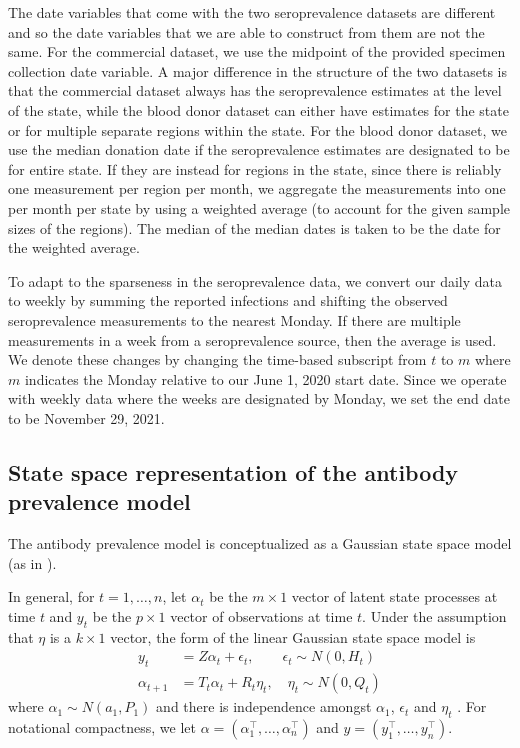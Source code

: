 The date variables that come with the two seroprevalence datasets are different
and so the date variables that we are able to construct from them are not the
same. For the commercial dataset, we use the midpoint of the provided specimen
collection date variable. A major difference in the structure of the two
datasets is that the commercial dataset always has the seroprevalence estimates
at the level of the state, while the blood donor dataset can either have
estimates for the state or for multiple separate regions within the state. For
the blood donor dataset, we use the median donation date if the seroprevalence
estimates are designated to be for entire state. If they are instead for regions
in the state, since there is reliably one measurement per region per month, we
aggregate the measurements into one per month per state by using a weighted
average (to account for the given sample sizes of the regions). The median of
the median dates is taken to be the date for the weighted average.

To adapt to the sparseness in the seroprevalence data, we convert our daily data
to weekly by summing the reported infections and shifting the observed
seroprevalence measurements to the nearest Monday. If there are multiple
measurements in a week from a seroprevalence source, then the average is used.
We denote these changes by changing the time-based subscript from $t$ to $m$
where $m$ indicates the Monday relative to our June 1, 2020 start date.
Since we operate with weekly data where the weeks are designated by Monday, we set the 
end date to be November 29, 2021. 

\subsection{State space representation of the antibody prevalence
model}\label{supp:ssapm} 

The antibody prevalence model is conceptualized
as a Gaussian state space model (as in \citealp{durbin2012time, helske2017kfas}).

In general, for $t = 1, \dots, n$, let $\alpha_t$ be the $m \times 1$ vector of
latent state processes at time $t$ and $y_t$ be the $p \times 1$ vector of
observations at time $t$. Under the assumption that $\eta$ is a $k \times 1$
vector, the form of the linear Gaussian state space model is 
\begin{align}
y_t &= Z\alpha_t + \epsilon_t, \qquad \epsilon_t \sim N(0, H_t) \label{eq:ss1}\\
\alpha_{t+1} &= T_t\alpha_t + R_t\eta_t, \quad \eta_t \sim N(0, Q_t) \label{eq:ss2}
\end{align}
where $\alpha_1 \sim N(a_1, P_1)$ and 
there is independence amongst $\alpha_1$, $\epsilon_t$ and $\eta_t$
\citep{helske2017kfas, durbin2012time}. For notational
compactness, we let $\alpha = \left ( \alpha_1^\top, \dots, \alpha_n^\top \right )$
and $y = \left ( y_1^\top, \dots, y_n^\top \right )$.

